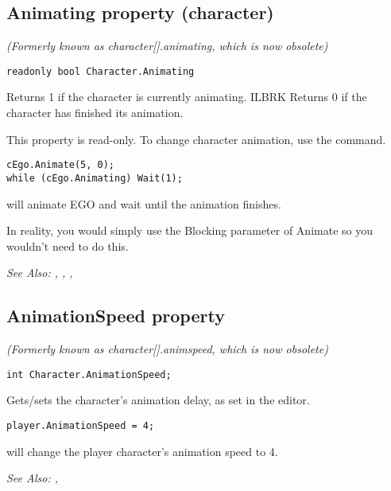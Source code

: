 \subsection{Animating property (character)}\label{Character.Animating}%

\it{(Formerly known as character[].animating, which is now obsolete)}

\begin{verbatim}
readonly bool Character.Animating
\end{verbatim}
Returns 1 if the character is currently animating. ILBRK
Returns 0 if the character has finished its animation.

This property is read-only. To change character animation, use the
 command.

\begin{verbatim}
cEgo.Animate(5, 0);
while (cEgo.Animating) Wait(1);
\end{verbatim}
will animate EGO and wait until the animation finishes.

In reality, you would simply use the Blocking parameter of Animate so you wouldn't need
to do this.

\it{See Also:} ,
,
,


\subsection{AnimationSpeed property}\label{Character.AnimationSpeed}%

\it{(Formerly known as character[].animspeed, which is now obsolete)}

\begin{verbatim}
int Character.AnimationSpeed;
\end{verbatim}

Gets/sets the character's animation delay, as set in the editor.

\begin{verbatim}
player.AnimationSpeed = 4;
\end{verbatim}
will change the player character's animation speed to 4.

\it{See Also:} ,


